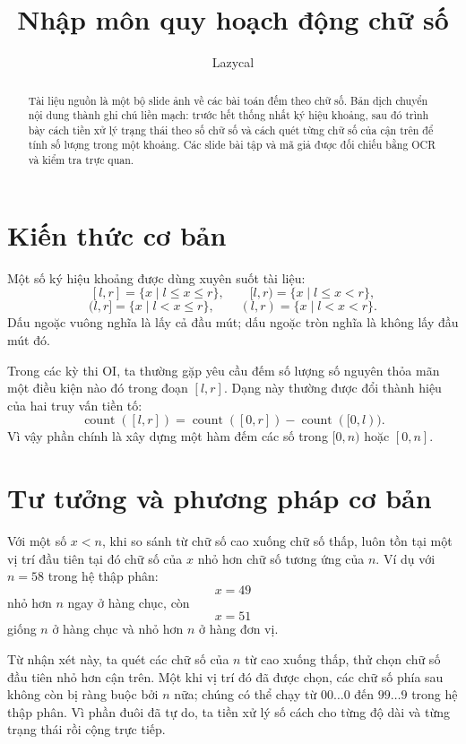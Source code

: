 \documentclass[11pt]{article}
\title{Nhập môn quy hoạch động chữ số}
\author{Lazycal}
\date{}
\begin{document}
\maketitle


\begin{abstract}
Tài liệu nguồn là một bộ slide ảnh về các bài toán đếm theo chữ số. Bản dịch
chuyển nội dung thành ghi chú liền mạch: trước hết thống nhất ký hiệu khoảng,
sau đó trình bày cách tiền xử lý trạng thái theo số chữ số và cách quét từng
chữ số của cận trên để tính số lượng trong một khoảng. Các slide bài tập và
mã giả được đối chiếu bằng OCR và kiểm tra trực quan.
\end{abstract}

\tableofcontents

\section{Kiến thức cơ bản}

Một số ký hiệu khoảng được dùng xuyên suốt tài liệu:
\[
  [l,r]=\{x\mid l\le x\le r\},\qquad
  [l,r)=\{x\mid l\le x<r\},
\]
\[
  (l,r]=\{x\mid l<x\le r\},\qquad
  (l,r)=\{x\mid l<x<r\}.
\]
Dấu ngoặc vuông nghĩa là lấy cả đầu mút; dấu ngoặc tròn nghĩa là không lấy
đầu mút đó.

Trong các kỳ thi OI, ta thường gặp yêu cầu đếm số lượng số nguyên thỏa mãn
một điều kiện nào đó trong đoạn $[l,r]$. Dạng này thường được đổi thành hiệu
của hai truy vấn tiền tố:
\[
  \operatorname{count}([l,r])
  =\operatorname{count}([0,r])-\operatorname{count}([0,l)).
\]
Vì vậy phần chính là xây dựng một hàm đếm các số trong $[0,n)$ hoặc
$[0,n]$.

\section{Tư tưởng và phương pháp cơ bản}

Với một số $x<n$, khi so sánh từ chữ số cao xuống chữ số thấp, luôn tồn tại
một vị trí đầu tiên tại đó chữ số của $x$ nhỏ hơn chữ số tương ứng của $n$.
Ví dụ với $n=58$ trong hệ thập phân:
\[
  x=49
\]
nhỏ hơn $n$ ngay ở hàng chục, còn
\[
  x=51
\]
giống $n$ ở hàng chục và nhỏ hơn $n$ ở hàng đơn vị.

Từ nhận xét này, ta quét các chữ số của $n$ từ cao xuống thấp, thử chọn chữ số
đầu tiên nhỏ hơn cận trên. Một khi vị trí đó đã được chọn, các chữ số phía sau
không còn bị ràng buộc bởi $n$ nữa; chúng có thể chạy từ $00\ldots0$ đến
$99\ldots9$ trong hệ thập phân. Vì phần đuôi đã tự do, ta tiền xử lý số cách
cho từng độ dài và từng trạng thái rồi cộng trực tiếp.
\end{document}
